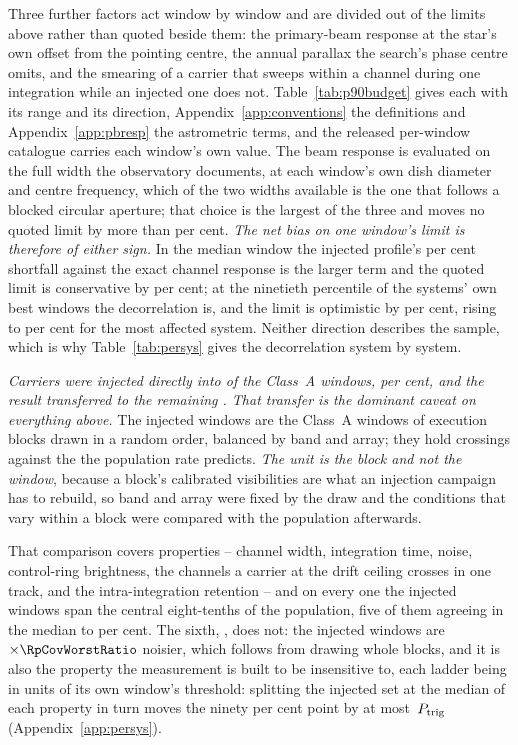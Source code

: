 Three further factors act window by window and are divided out of the limits
above rather than quoted beside them: the primary-beam response at the star's
own offset from the pointing centre, the annual parallax the search's phase
centre omits, and the smearing of a carrier that sweeps within a channel
during one integration while an injected one does not.
Table~\ref{tab:p90budget} gives each with its range and its direction,
Appendix~\ref{app:conventions} the definitions and
Appendix~\ref{app:pbresp} the astrometric terms, and the released per-window
catalogue carries each window's own value. The beam response is evaluated on
the full width the observatory documents, at each window's own dish diameter
and centre frequency, which of the two widths available is the one that
follows a blocked circular aperture; that choice is the largest of the three
and moves no quoted limit by more than \BmModelMaxPct{} per cent.
\emph{The net bias on one window's limit is therefore of either sign.} In the
median window the injected profile's \InjShortPct{} per cent shortfall
against the exact channel response is the larger term and the quoted limit is
conservative by \NmNetConsPct{} per cent; at the ninetieth percentile of the
systems' own best windows the decorrelation is, and the limit is optimistic
by \NmNetOptPct{} per cent, rising to \NmNetOptMaxPct{} per cent for the most
affected system. Neither direction describes the sample, which is why
Table~\ref{tab:persys} gives the decorrelation system by system.

\emph{Carriers were injected directly into \SensNInj{} of the \NWinA{}
Class~A windows, \SensNInjPct{} per cent, and the result transferred to the
remaining \SensNTransfer. That transfer is the dominant caveat on everything
above.} The injected windows are the Class~A windows of execution blocks
drawn in a random order, balanced by band and array; they hold
\SensNCrossAch{} crossings against the \SensNCrossExp{} the population rate
predicts. \emph{The unit is the block and not the window}, because a block's
calibrated visibilities are what an injection campaign has to rebuild, so
band and array were fixed by the draw and the conditions that vary within a
block were compared with the population afterwards.

That comparison covers \RpNAxis{} properties -- channel width, integration
time, noise, control-ring brightness, the channels a carrier at the drift
ceiling crosses in one track, and the intra-integration retention -- and on
every one the injected windows span the central eight-tenths of the
population, five of them agreeing in the median to \RpCovOtherPct{} per cent.
The sixth, \RpCovWorstAxis, does not: the injected windows are
$\times\RpCovWorstRatio$ noisier, which follows from drawing whole blocks,
and it is also the property the measurement is built to be insensitive to,
each ladder being in units of its own window's threshold: splitting the
injected set at the median of each property in turn moves the ninety per cent
point by at most \RpFacShiftMax\,$P_{\rm trig}$ (Appendix~\ref{app:persys}).

